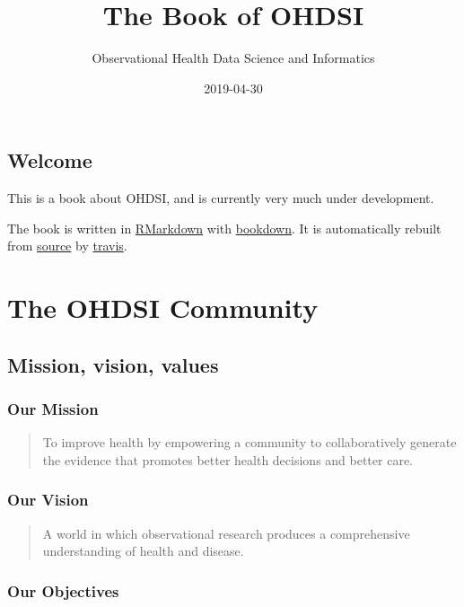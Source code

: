 \documentclass[]{book}
\title{The Book of OHDSI}
\author{Observational Health Data Science and Informatics}
\date{2019-04-30}
\begin{document}
\maketitle

{
\setcounter{tocdepth}{1}
\tableofcontents
}
\chapter*{Welcome}\label{welcome}

 This is a book about OHDSI, and is currently very much under
development.

The book is written in \href{https://rmarkdown.rstudio.com}{RMarkdown}
with \href{https://bookdown.org}{bookdown}. It is automatically rebuilt
from \href{https://github.com/OHDSI/TheBookOfOhdsi}{source} by
\href{http://travis-ci.org/}{travis}.

\part{The OHDSI Community}\label{part-the-ohdsi-community}

\chapter{Mission, vision, values}\label{MissionVissionValues}

\section{Our Mission}\label{our-mission}

\begin{quote}
To improve health by empowering a community to collaboratively generate
the evidence that promotes better health decisions and better care.
\end{quote}

\section{Our Vision}\label{our-vision}

\begin{quote}
A world in which observational research produces a comprehensive
understanding of health and disease.
\end{quote}

\section{Our Objectives}\label{our-objectives}
\end{document}
